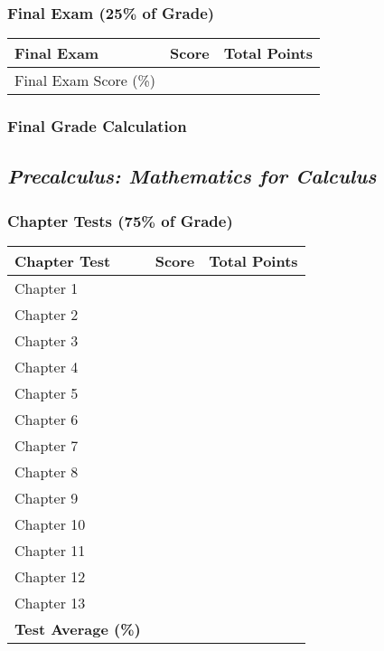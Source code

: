 \documentclass[11pt, letterpaper]{article}
\begin{document}
\subsubsection*{Final Exam (25\% of Grade)}
\begin{tabular}{|p{6cm}|p{3cm}|p{3cm}|}
\hline
\textbf{Final Exam} & \textbf{Score} & \textbf{Total Points} \\
\hline
Final Exam Score (\%) & & \\
\hline
\end{tabular}

\subsubsection*{Final Grade Calculation}

\subsection*{\textit{Precalculus: Mathematics for Calculus}}
\subsubsection*{Chapter Tests (75\% of Grade)}
\begin{tabular}{|p{6cm}|p{3cm}|p{3cm}|}
\hline
\textbf{Chapter Test} & \textbf{Score} & \textbf{Total Points} \\
\hline
Chapter 1 & & \\ \hline
Chapter 2 & & \\ \hline
Chapter 3 & & \\ \hline
Chapter 4 & & \\ \hline
Chapter 5 & & \\ \hline
Chapter 6 & & \\ \hline
Chapter 7 & & \\ \hline
Chapter 8 & & \\ \hline
Chapter 9 & & \\ \hline
Chapter 10 & & \\ \hline
Chapter 11 & & \\ \hline
Chapter 12 & & \\ \hline
Chapter 13 & & \\ \hline
\textbf{Test Average (\%)} & & \\
\hline
\end{tabular}
\end{document}
